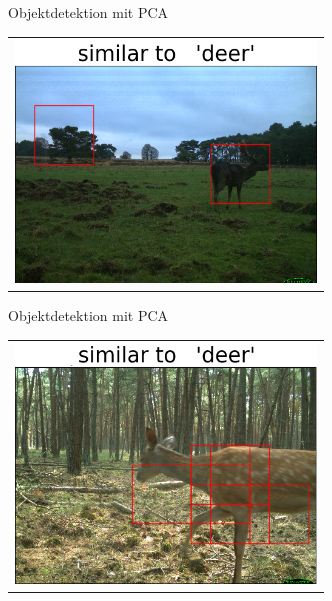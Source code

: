 \begin{frame}[t,fragile]{Objektdetektion mit  PCA}
  \vspace{0.01em}
  {
\begin{table}
\centering
        \begin{tabular}{c}
        \includegraphics[width=8cm]{images/Segmentierung/seg(2).png}\\
         \end{tabular}
\end{table}
 }

\end{frame}


\begin{frame}[t,fragile]{Objektdetektion mit  PCA}
  \vspace{0.01em}
  {
\begin{table}
\centering
        \begin{tabular}{c}
        \includegraphics[width=8cm]{images/Segmentierung/seg(3).png}\\
         \end{tabular}
\end{table}
 }

\end{frame}


